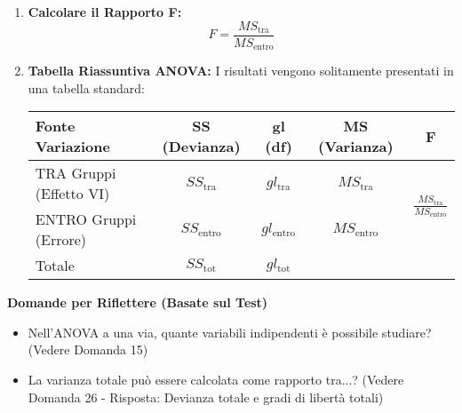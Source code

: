 \documentclass[12pt, a4paper]{article}
\newenvironment{reflectionbox}{%
    \medskip
    \begin{framed}\par\noindent
    \textbf{\color{boxtitlecolor}Domande per Riflettere (Basate sul Test)} \par
    \begin{itemize}[leftmargin=*, label=$\blacktriangleright$]
}{%
    \end{itemize}\par
    \end{framed}
    \medskip
}
\newcommand{\Fscore}{F} %
\newcommand{\df}{gl} %
\newcommand{\SSb}{SS_{\text{tra}}} %
\newcommand{\SSw}{SS_{\text{entro}}} %
\newcommand{\SStot}{SS_{\text{tot}}} %
\newcommand{\MSb}{MS_{\text{tra}}} %
\newcommand{\MSw}{MS_{\text{entro}}} %
\newcommand{\dfb}{\df_{\text{tra}}} %
\newcommand{\dfw}{\df_{\text{entro}}} %
\newcommand{\dftot}{\df_{\text{tot}}} %
\begin{document}
\begin{enumerate}
\begin{itemize}
        \end{itemize}
    \item \textbf{Calcolare il Rapporto F:}
        $$ \Fscore = \frac{\MSb}{\MSw} $$
    \item \textbf{Tabella Riassuntiva ANOVA:} I risultati vengono solitamente presentati in una tabella standard:
        \begin{center}
        \begin{tabular}{lcccc} %
            \toprule
            Fonte Variazione & SS (Devianza) & gl (df) & MS (Varianza) & F  \\
            \midrule
            TRA Gruppi (Effetto VI) & $\SSb$ & $\dfb$ & $\MSb$ & \multirow{2}{*}{$\frac{\MSb}{\MSw}$}  \\
            ENTRO Gruppi (Errore) & $\SSw$ & $\dfw$ & $\MSw$ &    \\
            \midrule
            Totale & $\SStot$ & $\dftot$ & &  \\
            \bottomrule
        \end{tabular}
        \end{center}
\end{enumerate}

\begin{reflectionbox}
    \item Nell'ANOVA a una via, quante variabili indipendenti è possibile studiare? (Vedere Domanda 15)
    \item La varianza totale può essere calcolata come rapporto tra...? (Vedere Domanda 26 - Risposta: Devianza totale e gradi di libertà totali)
\end{reflectionbox}
\end{document}
